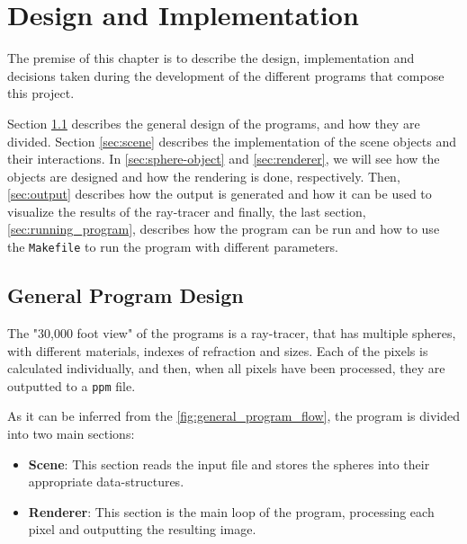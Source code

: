 \chapter{Design and Implementation}\label{chap:design}

The premise of this chapter is to describe the design, implementation and decisions taken during the development of the different programs that compose this project.

Section \ref{sec:general_program_design} describes the general design of the programs, and how they are divided. Section \ref{sec:scene} describes the implementation of the scene objects and their interactions. In \autoref{sec:sphere-object} and \autoref{sec:renderer}, we will see how the objects are designed and how the rendering is done, respectively. Then, \autoref{sec:output} describes how the output is generated and how it can be used to visualize the results of the ray-tracer and finally, the last section, \ref{sec:running_program}, describes how the program can be run and how to use the \texttt{Makefile} to run the program with different parameters.

\section{General Program Design}
\label{sec:general_program_design}
The "30,000 foot view" of the programs is a ray-tracer, that has multiple spheres, with different materials, indexes of refraction and sizes. Each of the pixels is calculated individually, and then, when all pixels have been processed, they are outputted to a \texttt{ppm} file.

As it can be inferred from the \autoref{fig:general_program_flow}, the program is divided into two main sections:
\begin{itemize}
    \item \textbf{Scene}: This section reads the input file and stores the spheres into their appropriate data-structures.
    \item \textbf{Renderer}: This section is the main loop of the program, processing each pixel and outputting the resulting image.
\end{itemize}



